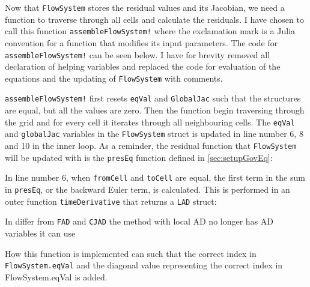 Now that \texttt{FlowSystem} stores the residual values and its Jacobian, we need a function to traverse through all cells and calculate the residuals.  I have chosen to call this function \texttt{assembleFlowSystem!} where the exclamation mark is a Julia convention for a function that modifies its input parameters. The code for \texttt{assembleFlowSystem!} can be seen below. I have for brevity removed all declaration of helping variables and replaced the code for evaluation of the equations and the updating of \texttt{FlowSystem} with comments.
\lstset{numbers=left}

\lstset{numbers=none}
\texttt{assembleFlowSystem!} first resets \texttt{eqVal} and \texttt{GlobalJac} such that the structures are equal, but all the values are zero. Then the function begin traversing through the grid and for every cell it iterates through all neighbouring cells. The \texttt{eqVal} and \texttt{globalJac} variables in the \texttt{FlowSystem} struct is updated in line number 6, 8 and 10 in the inner loop. As a reminder, the residual function that \texttt{FlowSystem} will be updated with is the \texttt{presEq} function defined in \autoref{sec:setupGovEq}:

In line number 6, when \texttt{fromCell} and \texttt{toCell} are equal, the first term in the sum in \texttt{presEq}, or the backward Euler term, is calculated. This is performed in an outer function \texttt{timeDerivative} that returns a \texttt{LAD} struct:

In differ from \texttt{FAD} and \texttt{CJAD} the method with local AD no longer has AD variables it can use 

How this function is implemented can such that the correct index in \texttt{FlowSystem.eqVal} and the diagonal value representing the correct index in FlowSystem.eqVal is added.

